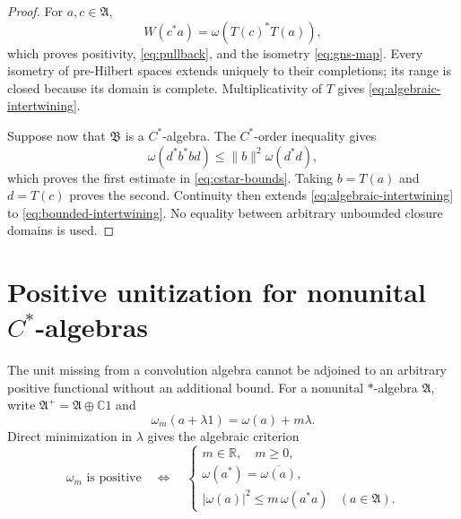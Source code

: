 \documentclass[11pt]{article}
\theoremstyle{definition}
\theoremstyle{remark}
\numberwithin{equation}{section}
\newcommand{\R}{\mathbb R}
\newcommand{\C}{\mathbb C}
\begin{document}
\begin{proof}
For $a,c\in\mathfrak A$,
\[
 W(c^*a)=\omega(T(c)^*T(a)),
\]
which proves positivity, \eqref{eq:pullback}, and the isometry
\eqref{eq:gns-map}.  Every isometry of pre-Hilbert spaces extends
uniquely to their completions; its range is closed because its domain is
complete.  Multiplicativity of $T$ gives
\eqref{eq:algebraic-intertwining}.

Suppose now that $\mathfrak B$ is a $C^*$-algebra.  The $C^*$-order
inequality gives
\[
 \omega(d^*b^*bd)\leq\|b\|^2\omega(d^*d),
\]
which proves the first estimate in \eqref{eq:cstar-bounds}.  Taking
$b=T(a)$ and $d=T(c)$ proves the second.  Continuity then extends
\eqref{eq:algebraic-intertwining} to
\eqref{eq:bounded-intertwining}.  No equality between arbitrary
unbounded closure domains is used.
\end{proof}

\section{Positive unitization for nonunital
\texorpdfstring{$C^*$}{C-star}-algebras}

The unit missing from a convolution algebra cannot be adjoined to an
arbitrary positive functional without an additional bound.  For a
nonunital $*$-algebra $\mathfrak A$, write
$\mathfrak A^+=\mathfrak A\oplus\C1$ and
\begin{equation}
 \omega_m(a+\lambda1)=\omega(a)+m\lambda.
 \label{eq:unit-extension}
\end{equation}
Direct minimization in $\lambda$ gives the algebraic criterion
\begin{equation}
 \omega_m\text{ is positive}
 \quad\Longleftrightarrow\quad
 \begin{cases}
 m\in\R,\quad m\geq0,\\
 \omega(a^*)=\overline{\omega(a)},\\
 |\omega(a)|^2\leq m\,\omega(a^*a)&(a\in\mathfrak A).
 \end{cases}
 \label{eq:unit-criterion}
\end{equation}
\end{document}

